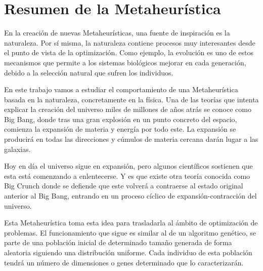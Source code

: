 \newpage %

\tableofcontents %

\newpage




\part{Resumen de la Metaheurística}

En la creación de nuevas Metaheurísticas, una fuente de inspiración es la naturaleza. Por sí misma, la naturaleza contiene procesos muy interesantes desde el punto de vista de la optimización. Como ejemplo, la evolución es uno de estos mecanismos que permite a los sistemas biológicos mejorar en cada generación, debido a la selección natural que sufren los individuos.

En este trabajo vamos a estudiar el comportamiento de una Metaheurística basada en la naturaleza, concretamente en la física. Una de las teorías que intenta explicar la creación del universo miles de millones de años atrás se conoce como Big Bang, donde tras una gran explosión en un punto concreto del espacio, comienza la expansión de materia y energía por todo este. La expansión se producirá en todas las direcciones y cúmulos de materia cercana darán lugar a las galaxias. 

Hoy en día el universo sigue en expansión, pero algunos científicos sostienen que esta está comenzando a enlentecerse. Y es que existe otra teoría conocida como Big Crunch donde se defiende que este volverá a contraerse al estado original anterior al Big Bang, entrando en un proceso cíclico de expansión-contracción del universo.

Esta Metaheurística toma esta idea para trasladarla al ámbito de optimización de problemas. El funcionamiento que sigue es similar al de un algoritmo genético, se parte de una población inicial de determinado tamaño generada de forma aleatoria siguiendo una distribución uniforme. Cada individuo de esta población tendrá un número de dimensiones o genes determinado que lo caracterizarán.

